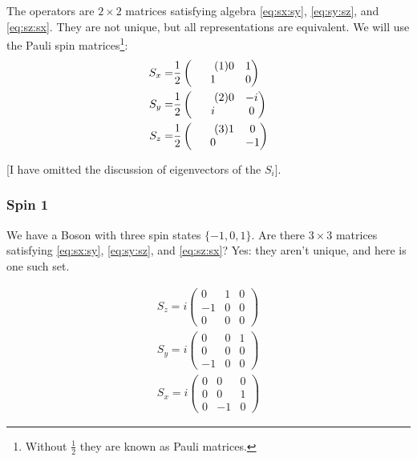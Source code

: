 \documentclass[]{article}
\newcommand\numberthis{\addtocounter{equation}{1}\tag{\theequation}}
\begin{document}
The operators are $2\times 2$ matrices satisfying algebra \eqref{eq:sx:sy}, \eqref{eq:sy:sz}, and \eqref{eq:sz:sx}. They are not unique, but all representations are equivalent. We will use the Pauli spin matrices\footnote{Without $\frac{1}{2}$ they are known as Pauli matrices.}:
\begin{align*}
	S_x =& \frac{1}{2}\begin{pmatrix} \numberthis \label{eq:pauli:x}
		0&1\\
		1&0
	\end{pmatrix}\\
	S_y =& \frac{1}{2}\begin{pmatrix} \numberthis \label{eq:pauli:y}
		0&-i\\
		i&0
	\end{pmatrix}\\
	S_z =& \frac{1}{2}\begin{pmatrix} \numberthis \label{eq:pauli:z}
		1&0\\
		0&-1
	\end{pmatrix}
\end{align*}

[I have omitted the discussion of eigenvectors of the $S_i$].

\subsubsection{Spin 1}

We have  a Boson with three spin states $\{-1,0,1\}$. Are there $3\times3$ matrices satisfying \eqref{eq:sx:sy}, \eqref{eq:sy:sz}, and \eqref{eq:sz:sx}? Yes: they aren't unique, and here is one such set.

\begin{align*}
	S_z = i \begin{pmatrix}
		0&1&0\\
		-1&0&0\\
		0&0&0
	\end{pmatrix}\\
	S_y = i \begin{pmatrix}
		0&0&1\\
		0&0&0\\
		-1&0&0
	\end{pmatrix}\\
	S_x = i \begin{pmatrix}
		0&0&0\\
		0&0&1\\
		0&-1&0
	\end{pmatrix}
\end{align*}
\end{document}
